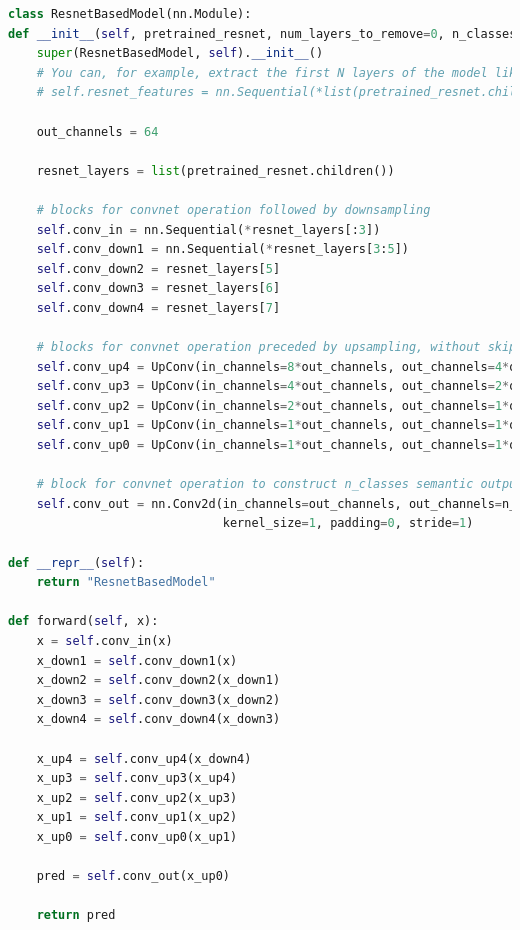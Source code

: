 \documentclass[11pt]{article}
\begin{document}
\begin{lstlisting}[language=Python, basicstyle=\scriptsize]
class ResnetBasedModel(nn.Module):
def __init__(self, pretrained_resnet, num_layers_to_remove=0, n_classes=9):
    super(ResnetBasedModel, self).__init__()
    # You can, for example, extract the first N layers of the model like this:
    # self.resnet_features = nn.Sequential(*list(pretrained_resnet.children())[:N])
    
    out_channels = 64

    resnet_layers = list(pretrained_resnet.children())

    # blocks for convnet operation followed by downsampling
    self.conv_in = nn.Sequential(*resnet_layers[:3])              
    self.conv_down1 = nn.Sequential(*resnet_layers[3:5])          
    self.conv_down2 = resnet_layers[5]                            
    self.conv_down3 = resnet_layers[6]                            
    self.conv_down4 = resnet_layers[7]                            

    # blocks for convnet operation preceded by upsampling, without skip connection
    self.conv_up4 = UpConv(in_channels=8*out_channels, out_channels=4*out_channels)
    self.conv_up3 = UpConv(in_channels=4*out_channels, out_channels=2*out_channels)
    self.conv_up2 = UpConv(in_channels=2*out_channels, out_channels=1*out_channels)
    self.conv_up1 = UpConv(in_channels=1*out_channels, out_channels=1*out_channels)
    self.conv_up0 = UpConv(in_channels=1*out_channels, out_channels=1*out_channels)

    # block for convnet operation to construct n_classes semantic outputs
    self.conv_out = nn.Conv2d(in_channels=out_channels, out_channels=n_classes, 
                              kernel_size=1, padding=0, stride=1)

def __repr__(self):
    return "ResnetBasedModel"        

def forward(self, x):
    x = self.conv_in(x)
    x_down1 = self.conv_down1(x)
    x_down2 = self.conv_down2(x_down1)
    x_down3 = self.conv_down3(x_down2)
    x_down4 = self.conv_down4(x_down3)

    x_up4 = self.conv_up4(x_down4)
    x_up3 = self.conv_up3(x_up4)
    x_up2 = self.conv_up2(x_up3)
    x_up1 = self.conv_up1(x_up2)
    x_up0 = self.conv_up0(x_up1)

    pred = self.conv_out(x_up0)

    return pred
\end{lstlisting}
\end{document}
